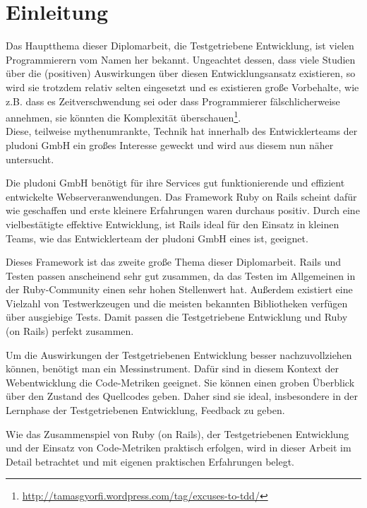 \chapter{Einleitung}

Das Hauptthema dieser Diplomarbeit, die Testgetriebene Entwicklung, ist vielen Programmierern vom Namen her bekannt. Ungeachtet dessen, dass  viele Studien über die (positiven) Auswirkungen über diesen Entwicklungsansatz  existieren, so wird sie trotzdem relativ selten eingesetzt und es existieren große Vorbehalte, wie z.B. dass es Zeitverschwendung sei oder dass Programmierer fälschlicherweise annehmen, sie könnten die Komplexität überschauen\footnote{\url{http://tamasgyorfi.wordpress.com/tag/excuses-to-tdd/}}.\\
Diese, teilweise mythenumrankte, Technik hat innerhalb des Entwicklerteams der pludoni GmbH ein großes Interesse geweckt und wird aus diesem nun näher untersucht.

Die pludoni GmbH benötigt für ihre Services gut funktionierende und effizient entwickelte Webserveranwendungen. Das Framework Ruby on Rails scheint dafür wie geschaffen und erste kleinere Erfahrungen waren durchaus positiv. Durch eine vielbestätigte effektive Entwicklung, ist Rails ideal für den Einsatz in kleinen Teams, wie das Entwicklerteam der pludoni GmbH eines ist, geeignet.

Dieses Framework  ist das zweite große Thema dieser Diplomarbeit. Rails und Testen passen anscheinend sehr gut zusammen, da das Testen im Allgemeinen in der Ruby-Community einen sehr hohen Stellenwert hat. Außerdem existiert eine Vielzahl von Testwerkzeugen und die meisten bekannten Bibliotheken verfügen über ausgiebige Tests. Damit passen die Testgetriebene Entwicklung und Ruby (on Rails) perfekt zusammen.

Um die Auswirkungen der Testgetriebenen Entwicklung besser nachzuvollziehen können, benötigt man ein Messinstrument. Dafür sind in diesem Kontext der Webentwicklung die Code-Metriken geeignet. Sie können einen groben Überblick über den Zustand des Quellcodes geben. Daher sind sie ideal, insbesondere in der Lernphase der Testgetriebenen Entwicklung, Feedback zu geben.

Wie das Zusammenspiel von Ruby (on Rails), der Testgetriebenen Entwicklung und der Einsatz von Code-Metriken praktisch erfolgen, wird in dieser Arbeit im Detail betrachtet und mit eigenen praktischen Erfahrungen belegt.

